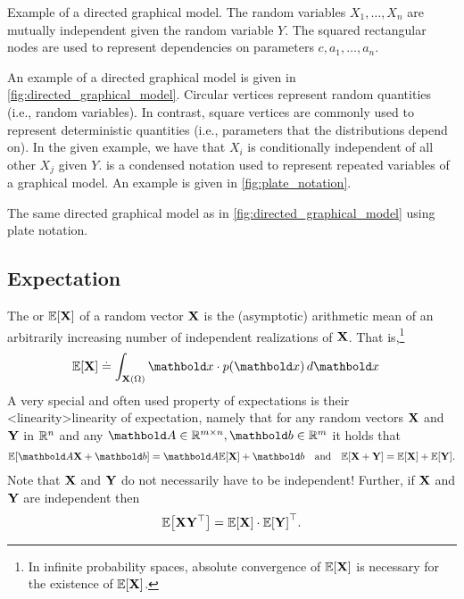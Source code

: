\begin{marginfigure}[-2\baselineskip]
  \caption{Example of a directed graphical model. The random variables $X_1, \dots, X_n$ are mutually independent given the random variable $Y$. The squared rectangular nodes are used to represent dependencies on parameters $c, a_1, \dots, a_n$.}\label{fig:directed_graphical_model}
\end{marginfigure}

An example of a directed graphical model is given in \cref{fig:directed_graphical_model}.
Circular vertices represent random quantities (i.e., random variables).
In contrast, square vertices are commonly used to represent deterministic quantities (i.e., parameters that the distributions depend on).
In the given example, we have that $X_i$ is conditionally independent of all other $X_j$ given $Y$.
 is a condensed notation used to represent repeated variables of a graphical model.
An example is given in \cref{fig:plate_notation}.

\begin{marginfigure}
  \caption{The same directed graphical model as in \cref{fig:directed_graphical_model} using plate notation.}
  \label{fig:plate_notation}
\end{marginfigure}

\subsection{Expectation}

The  or  $\E{\rX}$ of a random vector $\mathbf{X}$ is the (asymptotic) arithmetic mean of an arbitrarily increasing number of independent realizations of $\mathbf{X}$. That is,\footnote{In infinite probability spaces, absolute convergence of $\E{\rX}$ is necessary for the existence of $\E{\rX}$.} \begin{align}
  \E{\rX} &\defeq \int_{\rX(\Omega)} \vx \cdot p(\vx) \,d\vx \label{eq:expectation}
\end{align}
A very special and often used property of expectations is their \midx<linearity>{linearity of expectation}, namely that for any random vectors $\mathbf{X}$ and $\mathbf{Y}$ in $\mathbb{R}^n$ and any ${\mA \in \R^{m \times n}}, {\vb \in \R^m}$ it holds that \begin{align}
  \E{\mA \rX + \vb} = \mA \E{\rX} + \vb \quad\text{and}\quad \E{\rX + \rY} = \E{\rX} + \E{\rY}. \label{eq:linearity_expectation}
\end{align}
Note that $\mathbf{X}$ and $\mathbf{Y}$ do not necessarily have to be independent!
Further, if $\mathbf{X}$ and $\mathbf{Y}$ are independent then \begin{align}
  \E{\rX\transpose{\rY}} = \E{\rX} \cdot \transpose{\E{\rY}}. \label{eq:expectation_product}
\end{align}

